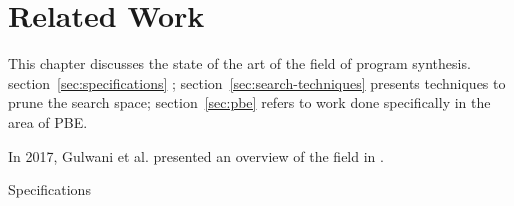 \chapter{Related Work}
\label{chapter:relatedWork}



This chapter discusses the state of the art of the field of program synthesis.
section~\ref{sec:specifications} ;
section~\ref{sec:search-techniques} presents techniques to prune the search
space;
section~\ref{sec:pbe} refers to work done specifically in the area of \ac{PBE}.

In 2017, Gulwani et al. presented an overview of the field in
\cite{Gulwani2017}.

{Specifications}
% 




